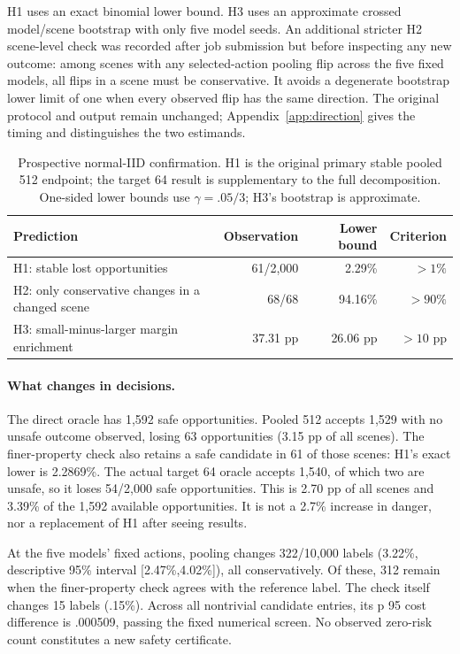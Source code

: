 H1 uses an exact binomial lower bound. H3 uses an approximate crossed model/scene
bootstrap with only five model seeds. An additional stricter H2 scene-level
check was recorded after job submission but before inspecting any new outcome:
among scenes with any selected-action pooling flip across the five fixed models,
all flips in a scene must be conservative. It avoids a degenerate bootstrap lower
limit of one when every observed flip has the same direction. The original
protocol and output remain unchanged; Appendix~\ref{app:direction} gives the
timing and distinguishes the two estimands.

\begin{table}[t]
\centering\small
\caption{Prospective normal-IID confirmation. H1 is the original primary stable
pooled 512 endpoint; the target 64 result is supplementary to the full decomposition.
One-sided lower bounds use $\gamma=.05/3$; H3's bootstrap is approximate.}
\label{tab:confirmation}
\begin{tabular}{p{.39\linewidth}rrr}
\toprule
Prediction & Observation & Lower bound & Criterion\\
\midrule
H1: stable lost opportunities &61/2,000&2.29\%&$>1\%$\\
H2: only conservative changes in a changed scene &68/68&94.16\%&$>90\%$\\
H3: small-minus-larger margin enrichment &37.31 pp&26.06 pp&$>10$ pp\\
\bottomrule
\end{tabular}
\end{table}

\paragraph{What changes in decisions.}
The direct oracle has 1,592 safe opportunities. Pooled 512 accepts 1,529 with no
unsafe outcome observed, losing 63 opportunities (3.15 pp of all scenes). The
finer-property check also retains a safe candidate in 61 of those scenes: H1's
exact lower is 2.2869\%. The actual target 64 oracle accepts 1,540, of which two
are unsafe, so it loses 54/2,000 safe opportunities. This is 2.70 pp of all scenes
and 3.39\% of the 1,592 available opportunities. It is not a 2.7\% increase in
danger, nor a replacement of H1 after seeing results.

At the five models' fixed actions, pooling changes 322/10,000 labels (3.22\%,
descriptive 95\% interval [2.47\%,4.02\%]), all conservatively. Of these, 312 remain
when the finer-property check agrees with the reference label. The check itself
changes 15 labels (.15\%). Across all nontrivial candidate entries, its p 95 cost
difference is .000509, passing the fixed numerical screen. No observed zero-risk
count constitutes a new safety certificate.

